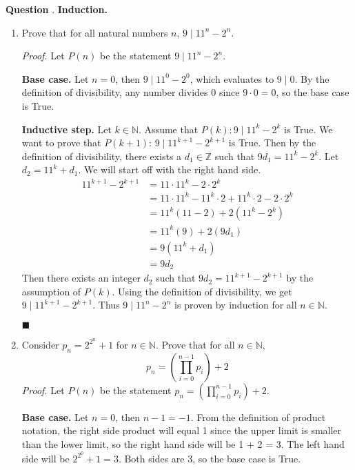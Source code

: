 \documentclass{article}
\newcounter{qcount}
\newcommand\q{\stepcounter{qcount} \textbf{Question \theqcount}. }
\newcommand\qedsymbol{\hfill$\blacksquare$}
\begin{document}
\newpage
\q \textbf{Induction.}
\begin{enumerate}[label=(\alph*)]
    \item Prove that for all natural numbers $n$, $9 \mid 11^n - 2^n$.
        
        \textit{Proof.} Let $P(n)$ be the statement $9 \mid 11^n - 2^n $.

        \textbf{Base case.} Let $n = 0$, then $9 \mid 11^0 - 2^0 $, which 
        evaluates to $9 \mid 0$. By the definition of divisibility, 
        any number divides 0 since $9 \cdot 0 = 0$, so the base case is True. 
        
        \textbf{Inductive step.} Let $k \in \mathbb{N}$. Assume that $P(k):
        9 \mid 11^k - 2^k$ is True. We want to prove that 
        $P(k+1)$: $9 \mid 11^{k+1} - 2^{k+1}$ is True. Then by the definition 
        of divisibility, there exists a $d_1 \in \mathbb{Z}$ such that 
        $9d_1 = 11^k - 2^k$. Let $d_2 = 11^k + d_1$. We will start off with the right hand side.
        \begin{align*}
            11^{k+1} - 2^{k+1} &= 11 \cdot 11^k - 2 \cdot 2^k \\
                               &= 11 \cdot 11^k - 11^k \cdot 2 + 11^k \cdot 2 - 2 \cdot 2^k\\
                               &= 11^k (11 - 2) + 2 ( 11 ^k - 2^k)\\
                               &= 11^k (9) + 2 (9 d_1) \tag*{(By induction hypothesis)} \\
                               &= 9 (11^k + d_1) \\
                               &= 9 d_2
        \end{align*}
        Then there exists an integer $d_2$ such that $9 d_2 = 11^{k+1} - 2^{k+1}$ by 
        the assumption of $P(k)$. Using the 
        definition of divisibility, we get $9 \mid 11^{k+1} - 2^{k+1}$. Thus $9 \mid 11^n - 2^n$ is proven by induction for all $n \in \mathbb{N}$. 
        
        \qedsymbol
    \newpage
    \item Consider $p_n = 2^{2^n}+1$ for $n \in \mathbb{N}$. 
        Prove that for all $n \in \mathbb{N}$, $$p_n = \left(\prod_{i=0}^{n-1}
        p_i \right) + 2$$
        \textit{Proof.} Let $P(n)$ be the statement $p_n = (\prod_{i=0}^{
        n-1} p_i) + 2$.
        
        \textbf{Base case.} Let $n = 0$, then $n-1 = - 1$. From the definition 
        of product notation, the right side product will equal 1 since the upper 
        limit is smaller than the lower limit, so the right hand side will be 1 + 2 = 3. The left 
        hand side will be $2^{2^0} + 1 = 3$. Both sides are 3, so the base case is True.


\end{enumerate}
\end{document}
